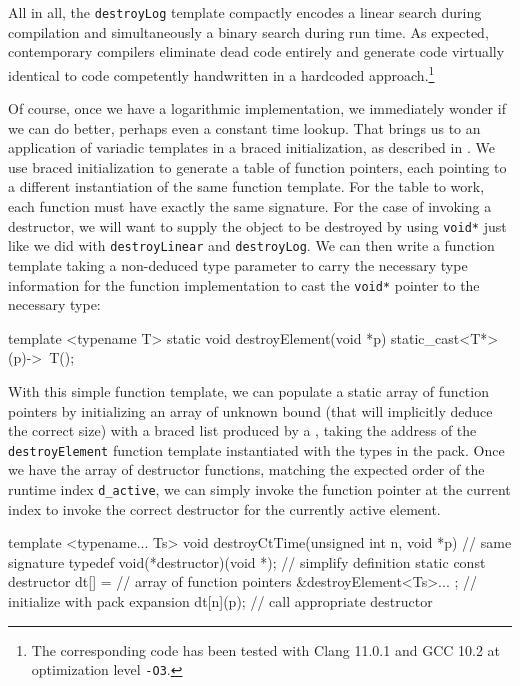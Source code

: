 All in all, the \lstinline!destroyLog! template compactly encodes a linear
search during compilation and simultaneously a binary search during run
time. As expected, contemporary compilers eliminate dead code entirely
and generate code virtually identical to code competently handwritten in
a hardcoded approach.{\cprotect\footnote{The corresponding code has been
tested with Clang 11.0.1 and GCC 10.2 at optimization level
  \lstinline!-O3!.}}

Of course, once we have a logarithmic implementation, we immediately
wonder if we can do better, perhaps even a constant time lookup. That
brings us to an application of variadic templates in a braced
initialization, as described in . We use braced
initialization to generate a table of function pointers, each pointing
to a different instantiation of the same function template. For the
table to work, each function must have exactly the same signature. For
the case of invoking a destructor, we will want to supply the object to
be destroyed by using \lstinline!void*! just like we did with
\lstinline!destroyLinear! and \lstinline!destroyLog!. We can then write a
function template taking a non-deduced type parameter to carry the
necessary type information for the function implementation to cast the
\lstinline!void*! pointer to the necessary type:

\begin{emcppslisting}[emcppsbatch={e38,e39}]
template <typename T>
static void destroyElement(void *p)
{
    static_cast<T*>(p)->~T();
}
\end{emcppslisting}
    

\noindent With this simple function template, we can populate a static array of
function pointers by initializing an array of unknown bound (that will
implicitly deduce the correct size) with a braced list produced by a
, taking the address of the
\lstinline!destroyElement! function template instantiated with the types in
the pack. Once we have the array of destructor functions, matching the
expected order of the runtime index \lstinline!d_active!, we can simply
invoke the function pointer at the current index to invoke the correct
destructor for the currently active element.

\begin{emcppslisting}[emcppsbatch={e38,e39}]
template <typename... Ts>
void destroyCtTime(unsigned int n, void *p)  // same signature
{
    typedef void(*destructor)(void *);       // simplify definition
    static const destructor dt[] =           // array of function pointers
        { &destroyElement<Ts>... };          // initialize with pack expansion
    dt[n](p);                                // call appropriate destructor
}
\end{emcppslisting}
    


